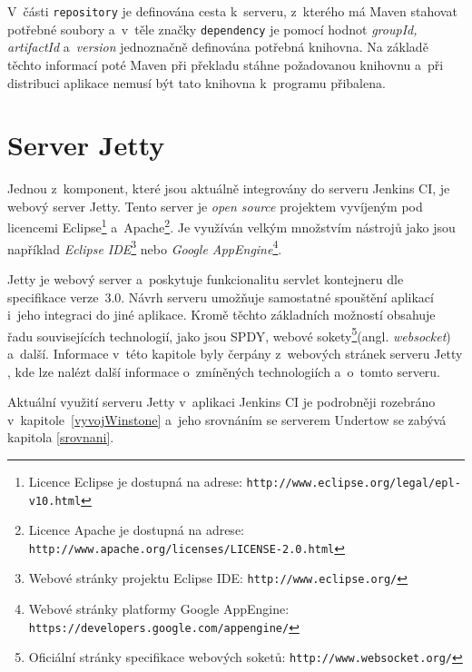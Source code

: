         V~části \texttt{repository} je definována cesta k~serveru, z~kterého má Maven stahovat potřebné soubory
        a~v~těle značky \texttt{dependency} je pomocí hodnot \emph{groupId, artifactId} a~\emph{version} jednoznačně
        definována potřebná knihovna. Na základě těchto informací poté Maven při překladu stáhne požadovanou
        knihovnu a~při distribuci aplikace nemusí být tato knihovna k~programu přibalena. 


    \section{Server Jetty} \label{jetty}
        Jednou z~komponent, které jsou aktuálně integrovány do serveru Jenkins CI, je webový server Jetty.
        Tento server je \emph{open source} projektem vyvíjeným pod licencemi 
        Eclipse\footnote{Licence Eclipse je dostupná na adrese: \texttt{http://www.eclipse.org/legal/epl-v10.html}}
        a~Apache\footnote{Licence Apache je dostupná 
        na adrese: \texttt{http://www.apache.org/licenses/LICENSE-2.0.html}}. 
            Je využíván velkým množstvím nástrojů jako jsou například \emph{Eclipse IDE}\footnote{Webové stránky projektu Eclipse IDE:
        \texttt{http://www.eclipse.org/}} nebo \emph{Google AppEngine}\footnote{Webové stránky platformy Google AppEngine:
        \texttt{https://developers.google.com/appengine/}}.

        Jetty je webový server a~poskytuje funkcionalitu servlet kontejneru dle specifikace verze~3.0. 
        Návrh serveru umožňuje samostatné spouštění aplikací i~jeho integraci do jiné aplikace. 
        Kromě těchto základních možností obsahuje
        řadu souvisejících technologií, jako jsou SPDY, webové sokety\footnote{Oficiální stránky 
            specifikace webových soketů: \texttt{http://www.websocket.org/}}(angl. \emph{websocket}) a~další. 
        Informace v~této kapitole byly čerpány z~webových stránek serveru Jetty \cite{jettyWeb}, kde lze nalézt 
        další informace o~zmíněných technologiích a~o~tomto serveru.
        
        Aktuální využití serveru Jetty v~aplikaci Jenkins CI je podrobněji rozebráno
        v~kapitole~\ref{vyvojWinstone} a~jeho srovnáním se serverem Undertow se 
        zabývá kapitola \ref{srovnani}.
        

